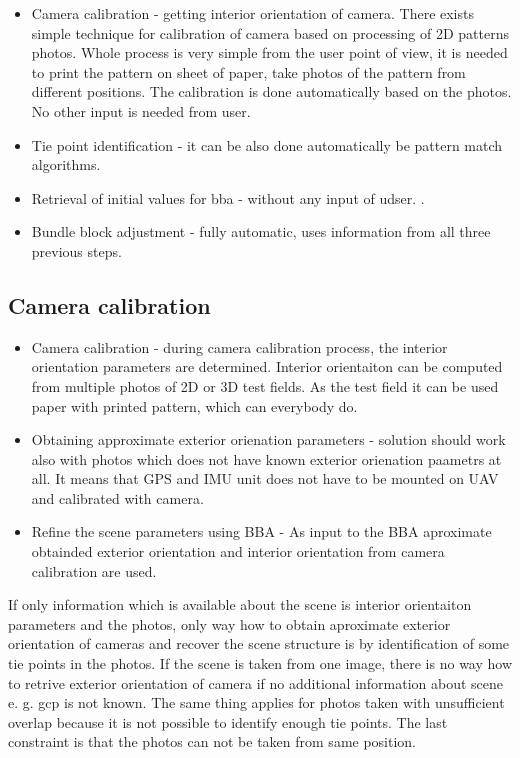 \documentclass[a4paper,12pt]{report}
\begin{document}
\begin{itemize}
\item Camera calibration - getting interior orientation of camera. There exists simple technique for calibration
of camera based on processing of 2D patterns photos. Whole process is very simple from the user point of view, it is needed 
to print the pattern on sheet of paper, take photos of the pattern from different positions. The calibration 
is done automatically based on the photos. No other input is needed from user.
\item Tie point identification - it can be also done automatically be pattern match algorithms.
\item Retrieval of initial values for bba - without any input of udser. .
\item Bundle block adjustment - fully automatic, uses information from all three previous steps.
\end{itemize}




\subsection{Camera calibration}
\begin{itemize}
\item Camera calibration - during camera calibration process, the interior orientation parameters 
			   are determined.
		             Interior orientaiton can be computed 
			     from multiple photos of 2D or 3D test fields. As the test field it can be used 
			     paper with printed pattern, which can everybody do. 
				
\item Obtaining approximate exterior orienation parameters - solution should work also with photos 
which does not have known exterior orienation paametrs at all. It means 
that GPS and IMU unit does not have to be mounted on UAV and calibrated with camera.
  

\item Refine the scene parameters using BBA - As input to the BBA aproximate obtainded exterior orientation
and interior orientation from camera calibration are used.

\end{itemize}

If only information which is available about the scene is interior orientaiton parameters and the photos, 
only way how to obtain aproximate exterior orientation of cameras and recover the scene structure is 
by identification of some tie points in the photos. If the scene is taken from one image, there is no way how
to retrive exterior orientation of camera if no additional information about scene e. g. gcp is not known. 
The same thing applies for photos taken with  unsufficient overlap because it is not possible to 
identify enough tie points. The last constraint is that the photos can not be taken from same position.
\end{document}
